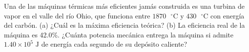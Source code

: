 \item Una de las máquinas térmicas más eficientes jamás construida es una turbina de vapor en el valle del río Ohio, que funciona entre $1870\text{ }^\circ\text{C}$ y $430\text{ }^\circ\text{C}$ con energía del carbón. (a) ¿Cuál es la máxima eficiencia teórica? (b) La eficiencia real de la máquina es 42.0\%. ¿Cuánta potencia mecánica entrega la máquina si admite $1.40 \times 10^5\text{ J}$ de energía cada segundo de su depósito caliente?
